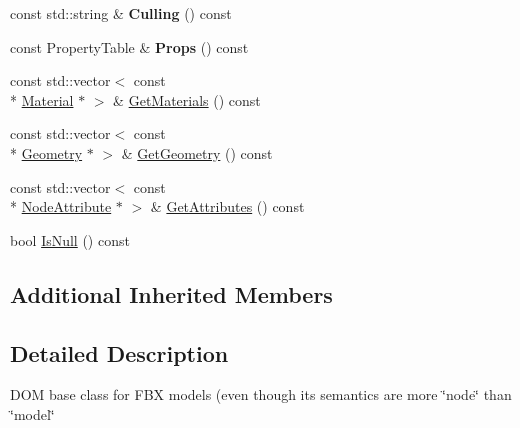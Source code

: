 \begin{DoxyCompactItemize}
\item 
\hypertarget{class_assimp_1_1_f_b_x_1_1_model_a12366db07599d988bc6855b0f501830c}{const std\+::string \& {\bfseries Culling} () const }\label{class_assimp_1_1_f_b_x_1_1_model_a12366db07599d988bc6855b0f501830c}

\item 
\hypertarget{class_assimp_1_1_f_b_x_1_1_model_aac45ff10d706305c55516deca467c9c8}{const Property\+Table \& {\bfseries Props} () const }\label{class_assimp_1_1_f_b_x_1_1_model_aac45ff10d706305c55516deca467c9c8}

\item 
const std\+::vector$<$ const \\*
\hyperlink{class_assimp_1_1_f_b_x_1_1_material}{Material} $\ast$ $>$ \& \hyperlink{class_assimp_1_1_f_b_x_1_1_model_a6da11059ae8b1a609cd03acbee71a64d}{Get\+Materials} () const 
\item 
const std\+::vector$<$ const \\*
\hyperlink{class_assimp_1_1_f_b_x_1_1_geometry}{Geometry} $\ast$ $>$ \& \hyperlink{class_assimp_1_1_f_b_x_1_1_model_ae343aa51e80e42b420e3a0340dddca14}{Get\+Geometry} () const 
\item 
const std\+::vector$<$ const \\*
\hyperlink{class_assimp_1_1_f_b_x_1_1_node_attribute}{Node\+Attribute} $\ast$ $>$ \& \hyperlink{class_assimp_1_1_f_b_x_1_1_model_a37da419509d9ec830e8426c136744a3b}{Get\+Attributes} () const 
\item 
bool \hyperlink{class_assimp_1_1_f_b_x_1_1_model_a13cef36de072c1838193021864cdfd9e}{Is\+Null} () const 
\end{DoxyCompactItemize}
\subsection*{Additional Inherited Members}


\subsection{Detailed Description}
D\+O\+M base class for F\+B\+X models (even though its semantics are more \char`\"{}node\char`\"{} than \char`\"{}model\char`\"{} 

